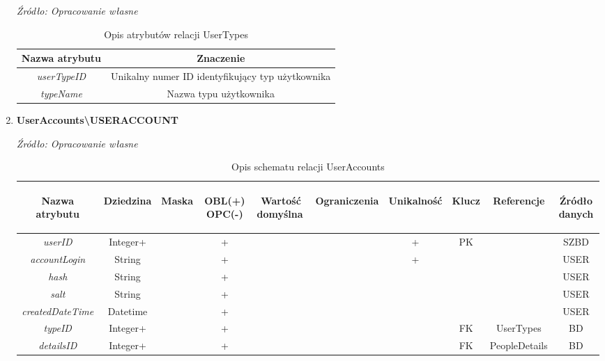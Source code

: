 \documentclass[12pt,oneside]{report}
\begin{document}
\begin{enumerate}[start=10,label={\bfseries REL\textbackslash\arabic*}]
\begin{table}[H]
	\caption{Opis atrybutów relacji UserTypes}
	\textit{Źródło: Opracowanie własne}
	\label{UserTypesAttributeDescription}
	\centering
	\begin{tabular}{|c|c|}
		\hline
		Nazwa atrybutu & Znaczenie \\
		\hline
		\textit{userTypeID}&Unikalny numer ID identyfikujący typ użytkownika\\	
		\hline
		\textit{typeName}& Nazwa typu użytkownika\\	
		\hline	
	\end{tabular}
\end{table}
	\item \textbf{UserAccounts\textbackslash USERACCOUNT}
	\begin{table}[H]
		\caption{Opis schematu relacji UserAccounts}
		\textit{Źródło: Opracowanie własne}
		\label{UserAccountsRelationSchema}
		\centering
		\begin{tabular}{|c|c|c|c|c|c|c|c|c|c|}
			\hline
			\begin{sideways}Nazwa atrybutu\end{sideways}& 
			\begin{sideways}Dziedzina \end{sideways}& 
			\begin{sideways}Maska \end{sideways}& 
			\begin{sideways}OBL(+) OPC(-)\end{sideways} & 
			\begin{sideways}Wartość domyślna$\ $\end{sideways}& 
			\begin{sideways}Ograniczenia\end{sideways} &
			\begin{sideways}Unikalność \end{sideways}& 
			\begin{sideways}Klucz \end{sideways}& 
			\begin{sideways}Referencje \end{sideways}&
			\begin{sideways}Źródło danych\end{sideways}\\
			\hline
			\textit{userID}&Integer+&&+&&&+&PK&&SZBD\\	
			\hline
			\textit{accountLogin}&String&&+&&&+&&&USER\\	
			\hline			
			\textit{hash}&String&&+&&&&&&USER\\	
			\hline			
			\textit{salt}&String&&+&&&&&&USER\\	
			\hline			
			\textit{createdDateTime}&Datetime&&+&&&&&&USER\\	
			\hline			
			\textit{typeID}&Integer+&&+&&&&FK&UserTypes&BD\\	
			\hline			
			\textit{detailsID}&Integer+&&+&&&&FK&PeopleDetails&BD\\	
			\hline
		\end{tabular}
	\end{table}
	

\end{enumerate}
\end{document}
